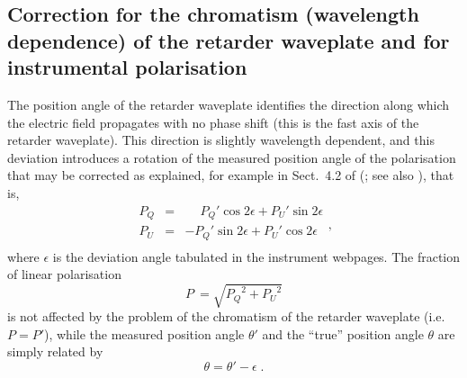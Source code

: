 \documentclass[a4paper]{aa}
\newcommand{\pq}{\ensuremath{P_Q}}
\newcommand{\pu}{\ensuremath{P_U}}
\newcommand{\pl}{\ensuremath{P}}
\begin{document}
\subsection{Correction for the chromatism (wavelength dependence) 
of the retarder waveplate and for instrumental polarisation}
The position angle of the retarder waveplate identifies the direction
along which the electric field propagates with no phase shift (this is
the fast axis of the retarder waveplate).  This direction is slightly
wavelength dependent, and this deviation introduces a rotation of the
measured position angle of the polarisation that may be corrected as
explained, for example in Sect.~4.2 of
\citeauthor{Bagetal09} (\citeyear{Bagetal09}; see also
\citealt{Patetal11}), that is,
\begin{equation}
  \begin{array}{rcl}
  \pq &=& \phantom{-}\pq' \cos2\epsilon + \pu' \sin2\epsilon \\
  \pu &=& -\pq' \sin2\epsilon + \pu' \cos2\epsilon \\
\end{array}
\label{Eq_Rotation}
,\end{equation}
where $\epsilon$ is the deviation angle tabulated in the instrument
webpages. The fraction of linear polarisation
\begin{equation}
\pl\ = \sqrt{\pq^2+\pu^2} 
\end{equation}
is not affected by the problem of the
chromatism of the retarder waveplate (i.e. $\pl=\pl'$), while the
measured position angle $\theta'$ and the ``true'' position angle $\theta$
are simply related by
\begin{equation}
  \theta = \theta' - \epsilon \; .
  \label{Eq_theta}
\end{equation}
\end{document}
